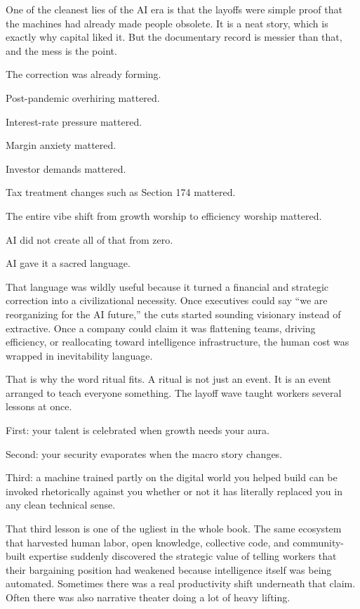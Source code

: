\documentclass[
  american,
  12pt,
  letterpaper,
]{article}
\begin{document}
One of the cleanest lies of the AI era is that the layoffs were simple
proof that the machines had already made people obsolete. It is a neat
story, which is exactly why capital liked it. But the documentary record
is messier than that, and the mess is the point.

The correction was already forming.

Post-pandemic overhiring mattered.

Interest-rate pressure mattered.

Margin anxiety mattered.

Investor demands mattered.

Tax treatment changes such as Section 174 mattered.

The entire vibe shift from growth worship to efficiency worship
mattered.

AI did not create all of that from zero.

AI gave it a sacred language.

That language was wildly useful because it turned a financial and
strategic correction into a civilizational necessity. Once executives
could say ``we are reorganizing for the AI future,'' the cuts started
sounding visionary instead of extractive. Once a company could claim it
was flattening teams, driving efficiency, or reallocating toward
intelligence infrastructure, the human cost was wrapped in inevitability
language.

That is why the word ritual fits. A ritual is not just an event. It is
an event arranged to teach everyone something. The layoff wave taught
workers several lessons at once.

First: your talent is celebrated when growth needs your aura.

Second: your security evaporates when the macro story changes.

Third: a machine trained partly on the digital world you helped build
can be invoked rhetorically against you whether or not it has literally
replaced you in any clean technical sense.

That third lesson is one of the ugliest in the whole book. The same
ecosystem that harvested human labor, open knowledge, collective code,
and community-built expertise suddenly discovered the strategic value of
telling workers that their bargaining position had weakened because
intelligence itself was being automated. Sometimes there was a real
productivity shift underneath that claim. Often there was also narrative
theater doing a lot of heavy lifting.
\end{document}
